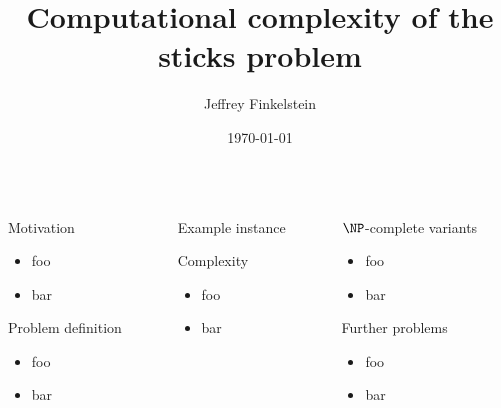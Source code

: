 \documentclass[beamer]{beamer}
\title{Computational complexity of the sticks problem}
\author{Jeffrey Finkelstein}
\institute{Boston University}
\date{\today}
\begin{document}
\begin{frame}{}
  \begin{columns}[t]

    \begin{column}{.3\linewidth}
      \begin{block}{\VeryHuge Motivation}
        \begin{itemize}\veryHuge
        \item foo
        \item bar
        \end{itemize}
      \end{block}
      \begin{block}{\VeryHuge Problem definition}
        \begin{itemize}\veryHuge
        \item foo
        \item bar
        \end{itemize}
      \end{block}
    \end{column}

    \begin{column}{.3\linewidth}
      \begin{block}{\VeryHuge Example instance}
      \end{block}
      \begin{block}{\VeryHuge Complexity}
        \begin{itemize}\veryHuge
        \item foo
        \item bar
        \end{itemize}
      \end{block}
    \end{column}

    \begin{column}{.3\linewidth}
      \begin{block}{\VeryHuge $\NP$-complete variants}
        \begin{itemize}\veryHuge
        \item foo
        \item bar
        \end{itemize}
      \end{block}
      \begin{block}{\VeryHuge Further problems}
        \begin{itemize}\veryHuge
        \item foo
        \item bar
        \end{itemize}
      \end{block}
    \end{column}
  \end{columns}
\end{frame}
\end{document}
